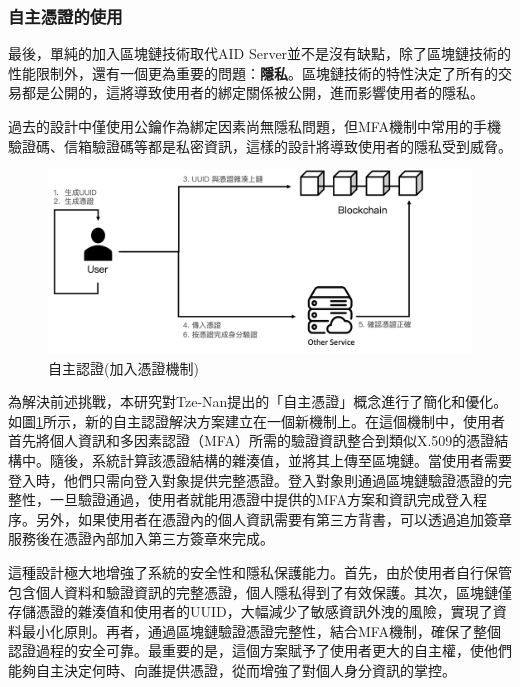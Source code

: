 \subsubsection{自主憑證的使用}
最後，單純的加入區塊鏈技術取代AID Server並不是沒有缺點，除了區塊鏈技術的性能限制外，還有一個更為重要的問題：\textbf{隱私}。區塊鏈技術的特性決定了所有的交易都是公開的，這將導致使用者的綁定關係被公開，進而影響使用者的隱私。

過去的設計中僅使用公鑰作為綁定因素尚無隱私問題，但MFA機制中常用的手機驗證碼、信箱驗證碼等都是私密資訊，這樣的設計將導致使用者的隱私受到威脅。

\begin{figure}
  \centering
  \includegraphics[width=\linewidth]{figures/new-aid-login.png}
  \caption{自主認證(加入憑證機制)}
  \label{fig:new-aid-login}
\end{figure}
為解決前述挑戰，本研究對Tze-Nan\cite{NTU202102846}提出的「自主憑證」概念進行了簡化和優化。如圖\ref{fig:new-aid-login}所示，新的自主認證解決方案建立在一個新機制上。在這個機制中，使用者首先將個人資訊和多因素認證（MFA）所需的驗證資訊整合到類似X.509的憑證結構中。隨後，系統計算該憑證結構的雜湊值，並將其上傳至區塊鏈。當使用者需要登入時，他們只需向登入對象提供完整憑證。登入對象則通過區塊鏈驗證憑證的完整性，一旦驗證通過，使用者就能用憑證中提供的MFA方案和資訊完成登入程序。另外，如果使用者在憑證內的個人資訊需要有第三方背書，可以透過追加簽章服務後在憑證內部加入第三方簽章來完成。

這種設計極大地增強了系統的安全性和隱私保護能力。首先，由於使用者自行保管包含個人資料和驗證資訊的完整憑證，個人隱私得到了有效保護。其次，區塊鏈僅存儲憑證的雜湊值和使用者的UUID，大幅減少了敏感資訊外洩的風險，實現了資料最小化原則。再者，通過區塊鏈驗證憑證完整性，結合MFA機制，確保了整個認證過程的安全可靠。最重要的是，這個方案賦予了使用者更大的自主權，使他們能夠自主決定何時、向誰提供憑證，從而增強了對個人身分資訊的掌控。
